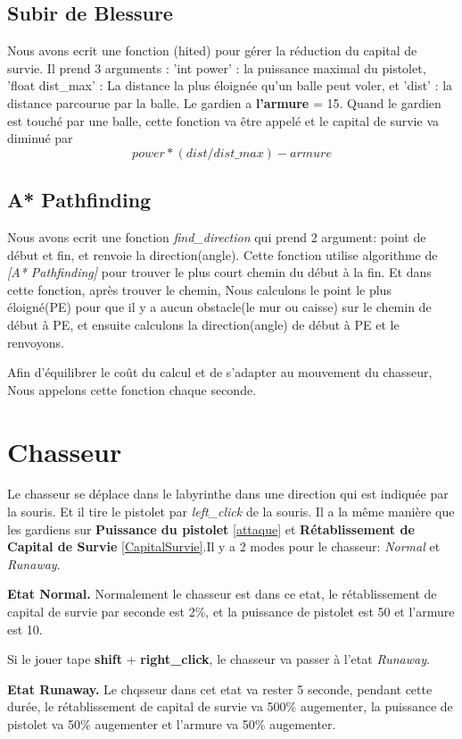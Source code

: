\documentclass{article}
\begin{document}
\subsection{Subir de Blessure}
\label{SubirBlessure}
Nous avons ecrit une fonction (hited) pour gérer la réduction du capital de survie. Il prend 3 arguments : 'int power' : la puissance maximal du pistolet, 'float dist\_max' : La distance la plus éloignée qu'un balle peut voler, et 'dist' : la distance parcourue par la balle. Le gardien a \textbf{l'armure} = 15. Quand le gardien est touché par une balle, cette fonction va être appelé et le capital de survie va diminué par $$power * (dist/dist\_max) - armure$$

\subsection{A* Pathfinding}
Nous avons ecrit une fonction \textsl{find\_direction} qui prend 2 argument: point de début et fin, et renvoie la direction(angle). Cette fonction utilise algorithme de \textsl{[A* Pathfinding]} pour trouver le plus court chemin du début à la fin. Et dans cette fonction, après trouver le chemin, Nous calculons le point le plus éloigné(PE) pour que il y a aucun obstacle(le mur ou caisse) sur le chemin de début à PE, et ensuite calculons la direction(angle) de début à PE et le renvoyons. 

Afin d'équilibrer le coût du calcul et de s'adapter au mouvement du chasseur, Nous appelons cette fonction chaque seconde.

\section{Chasseur}
Le chasseur se déplace dans le labyrinthe dans une direction qui est indiquée par la souris. Et il tire le pistolet par \textsl{left\_click} de la souris. Il a la même manière que les gardiens sur \textbf{Puissance du pistolet} \ref{attaque} et \textbf{Rétablissement de Capital de Survie} \ref{CapitalSurvie}.Il y a 2 modes pour le chasseur: \textsl{Normal} et \textsl{Runaway}.

\textbf{Etat Normal.} Normalement le chasseur est dans ce etat, le  rétablissement de capital de survie par seconde est 2\%, et la puissance de pistolet est 50 et l'armure est 10. 

Si le jouer tape \textbf{shift} + \textbf{right\_click}, le chasseur va passer à l'etat   \textsl{Runaway}.

\textbf{Etat Runaway.} Le chqsseur dans cet etat va rester 5 seconde, pendant cette durée,  le  rétablissement de capital de survie va 500\% augementer, la puissance de pistolet va 50\% augementer et l'armure va 50\% augementer.
\end{document}
